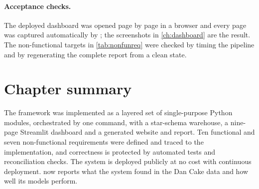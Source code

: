 \paragraph{Acceptance checks.} The deployed dashboard was opened page by page in a browser and every page was
captured automatically by ; the screenshots in \cref{ch:dashboard} are the
result. The non-functional targets in \cref{tab:nonfunreq} were checked by timing the pipeline and by
regenerating the complete report from a clean state.

\section{Chapter summary}
The framework was implemented as a layered set of single-purpose Python modules, orchestrated by one command,
with a star-schema warehouse, a nine-page Streamlit dashboard and a generated website and report. Ten functional
and seven non-functional requirements were defined and traced to the implementation, and correctness is
protected by automated tests and reconciliation checks. The system is deployed publicly at no cost with
continuous deployment.  now reports what the system found in the Dan Cake data and how well its
models perform.

